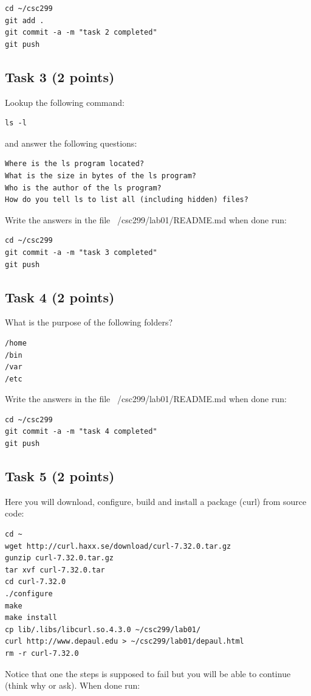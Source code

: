 \documentclass[12pt]{article}
\begin{document}
\begin{verbatim}
cd ~/csc299
git add .
git commit -a -m "task 2 completed"
git push
\end{verbatim}

\subsection{Task 3 (2 points)}

Lookup the following command:
\begin{verbatim}
ls -l
\end{verbatim}
and answer the following questions:
\begin{verbatim}
Where is the ls program located?
What is the size in bytes of the ls program?
Who is the author of the ls program?
How do you tell ls to list all (including hidden) files?
\end{verbatim}
Write the answers in the file ~/csc299/lab01/README.md when done run:

\begin{verbatim}
cd ~/csc299
git commit -a -m "task 3 completed"
git push
\end{verbatim}

\subsection{Task 4 (2 points)}

What is the purpose of the following folders?
\begin{verbatim} 
/home
/bin
/var
/etc
\end{verbatim} 
Write the answers in the file ~/csc299/lab01/README.md when done run:

\begin{verbatim}
cd ~/csc299
git commit -a -m "task 4 completed"
git push
\end{verbatim}

\subsection{Task 5 (2 points)}

Here you will download, configure, build and install a package (curl) from source code:

\begin{verbatim}
cd ~
wget http://curl.haxx.se/download/curl-7.32.0.tar.gz
gunzip curl-7.32.0.tar.gz
tar xvf curl-7.32.0.tar
cd curl-7.32.0
./configure
make
make install
cp lib/.libs/libcurl.so.4.3.0 ~/csc299/lab01/
curl http://www.depaul.edu > ~/csc299/lab01/depaul.html
rm -r curl-7.32.0
\end{verbatim}
Notice that one the steps is supposed to fail but you will be able to continue (think why or ask).
When done run:
\end{document}

